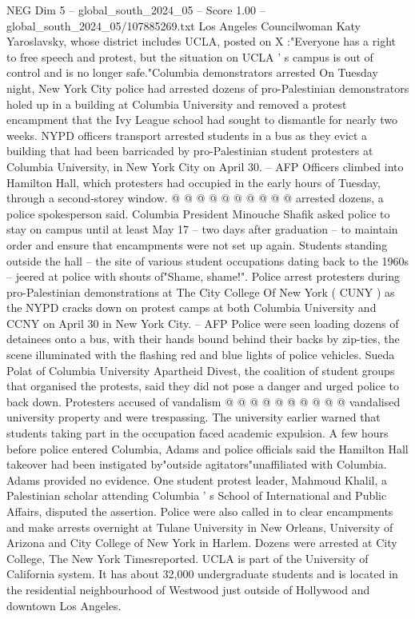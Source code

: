 \begin{textsample}{NEG Dim 5 – global\_south\_2024\_05 – Score 1.00 – global\_south\_2024\_05/107885269.txt}
Los Angeles Councilwoman Katy Yaroslavsky, whose district includes UCLA, posted on X :"Everyone has a right to free speech and protest, but the situation on UCLA ' s campus is out of control and is no longer safe."Columbia demonstrators arrested On Tuesday night, New York City police had arrested dozens of pro-Palestinian demonstrators holed up in a building at Columbia University and removed a protest encampment that the Ivy League school had sought to dismantle for nearly two weeks.
NYPD officers transport arrested students in a bus as they evict a building that had been barricaded by pro-Palestinian student protesters at Columbia University, in New York City on April 30. -- AFP Officers climbed into Hamilton Hall, which protesters had occupied in the early hours of Tuesday, through a second-storey window. @ @ @ @ @ @ @ @ @ @ arrested dozens, a police spokesperson said.
Columbia President Minouche Shafik asked police to stay on campus until at least May 17 -- two days after graduation -- to maintain order and ensure that encampments were not set up again.
Students standing outside the hall -- the site of various student occupations dating back to the 1960s -- jeered at police with shouts of"Shame, shame!".
Police arrest protesters during pro-Palestinian demonstrations at The City College Of New York ( CUNY ) as the NYPD cracks down on protest camps at both Columbia University and CCNY on April 30 in New York City. -- AFP Police were seen loading dozens of detainees onto a bus, with their hands bound behind their backs by zip-ties, the scene illuminated with the flashing red and blue lights of police vehicles.
Sueda Polat of Columbia University Apartheid Divest, the coalition of student groups that organised the protests, said they did not pose a danger and urged police to back down.
Protesters accused of vandalism @ @ @ @ @ @ @ @ @ @ vandalised university property and were trespassing.
The university earlier warned that students taking part in the occupation faced academic expulsion.
A few hours before police entered Columbia, Adams and police officials said the Hamilton Hall takeover had been instigated by"outside agitators"unaffiliated with Columbia.
Adams provided no evidence.
One student protest leader, Mahmoud Khalil, a Palestinian scholar attending Columbia ' s School of International and Public Affairs, disputed the assertion.
Police were also called in to clear encampments and make arrests overnight at Tulane University in New Orleans, University of Arizona and City College of New York in Harlem.
Dozens were arrested at City College, The New York Timesreported.
UCLA is part of the University of California system.
It has about 32,000 undergraduate students and is located in the residential neighbourhood of Westwood just outside of Hollywood and downtown Los Angeles.

\end{textsample}
